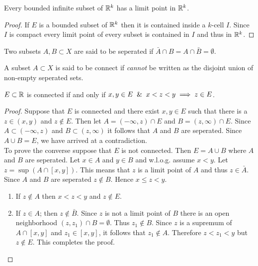 \begin{theorem}
  Every bounded infinite subset of $\mathbb{R}^k$ has a limit point in $\mathbb{R}^k$.
\end{theorem}
\begin{proof}
  If $E$ is a bounded subset of $\mathbb{R}^k$ then it is contained inside a $k$-cell $I$. Since $I$ is compact every limit point of every subset is contained in $I$ and thus in $\mathbb{R}^k$.
\end{proof}
\begin{definition}
  Two subsets $A,B \subset X$ are said to be seperated if $\bar{A}\cap B = A\cap \bar{B} = \emptyset$.
\end{definition}
\begin{definition}[Connected]
  A subset $A\subset X$ is said to be connect if \textit{cannot} be written as the disjoint union of non-empty seperated sets.
\end{definition}
\begin{theorem}
  $E\subset \mathbb{R}$ is connected if and only if $x,y \in E \And x<z<y \implies z\in E$.
\end{theorem}
\begin{proof}
  Suppose that $E$ is connected and there exist $x,y\in E$ such that there is a $z\in (x,y)$ and $z\notin E$. Then let $A= (-\infty, z)\cap E$ and $B= (z,\infty) \cap E$. Since $A\subset (-\infty,z)$ and $B\subset (z,\infty)$ it follows that $A$ and $B$ are seperated. Since $A\cup B = E$, we have arrived at a contradiction.\\

  To prove the converse suppose that $E$ is not connected. Then $E = A\cup B$ where $A$ and $B$ are seperated. Let $x\in A$ and $y\in B$ and w.l.o.g. assume $x<y$. Let $z =\sup(A\cap [x,y])$. This means that $z$ is a limit point of $A$ and thus $z\in \bar{A}$. Since $A$ and $B$ are seperated $z\notin B$. Hence $x\leq z < y$.
  \begin{enumerate}
    \item If $z\notin A$ then $x<z<y$ and $z \notin E$.
    \item If $z\in A$; then $z\notin \bar{B}$. Since $z$ is not a limit point of $B$ there is an open neighborhood $(z,z_1) \cap B = \emptyset$. Thus $z_1 \notin B$. Since $z$ is a supremum of $A\cap [x,y]$ and $z_1\in [x,y]$, it follows that $z_1\notin A$. Therefore $z<z_1<y$ but $z\notin E$. This completes the proof.
  \end{enumerate}
\end{proof}
